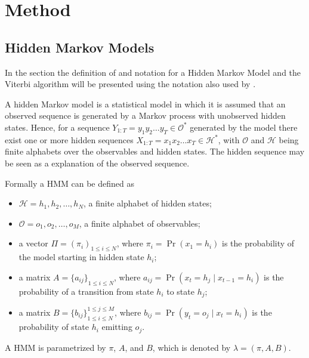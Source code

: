\chapter{Method}
\label{cha:method}


\section{Hidden Markov Models}


In the section the definition of and notation for a Hidden Markov Model and the
Viterbi algorithm will be presented using the notation also used by
\citet{sand2013ziphmmlib}.

A hidden Markov model is a statistical model in which it is assumed that an
observed sequence is generated by a Markov process with unobserved hidden
states. Hence, for a sequence $Y_{1:T} = y_1y_2\dots{}y_T \in \mathcal{O^*}$
generated by the model there exist one or more hidden sequences
$X_{1:T} = x_1x_2\dots{}x_T \in \mathcal{H^*}$, with $\mathcal{O}$ and
$\mathcal{H}$ being finite alphabets over the observables and hidden
states. The hidden sequence may be seen as a explanation of the observed
sequence.

Formally a HMM can be defined as
\begin{itemize}
\item $\mathcal{H} = {h_1, h_2, \dots, h_N}$, a finite alphabet of hidden
  states;
\item $\mathcal{O} = {o_1, o_2, \dots, o_M}$, a finite alphabet of observables;
\item a vector $\Pi = {(\pi_i)}_{1 \le i \le N}$, where $\pi_i = \Pr(x_1 =
  h_i)$ is the probability of the model starting in hidden state $h_i$;
\item a matrix $A = {\{a_{ij}\}}_{1 \le i \le N}$, where $a_{ij} = \Pr(x_t
  = h_j \mid x_{t - 1} = h_i)$ is the probability of a transition from state
  $h_i$ to state $h_j$;
\item a matrix $B = {\{b_{ij}\}}_{1 \le i \le N}^{1 \le j \le M}$, where
  $b_{ij} = \Pr(y_t = o_j \mid x_t = h_i)$ is the probability of state
  $h_i$ emitting $o_j$.
\end{itemize}

A HMM is parametrized by $\pi$, $A$, and $B$, which is denoted by $\lambda =
(\pi, A, B)$.

